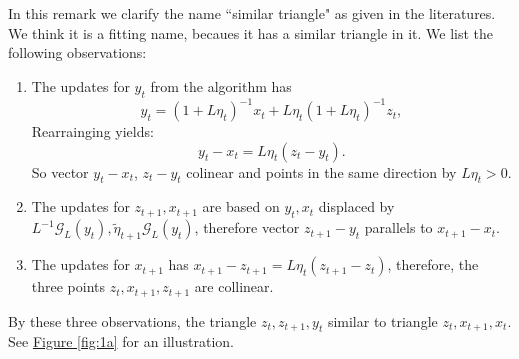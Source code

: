 \documentclass[12pt]{article}
\begin{document}
        \begin{remark}
            In this remark we clarify the name ``similar triangle" as given in the literatures. 
            We think it is a fitting name, becaues it has a similar triangle in it. 
            We list the following observations:
            \begin{enumerate}
                \item 
                The updates for $y_{t}$ from the algorithm has 
                $$
                    y_t = (1 + L\eta_t)^{-1} x_t + L\eta_t(1 + L\eta_t)^{-1} z_t, 
                $$
                Rearrainging yields: 
                $$
                    y_t - x_t = L\eta_t (z_t - y_t). 
                $$
                So vector $y_t - x_t$, $z_t - y_t$ colinear and points in the same direction by $L\eta_t > 0$. 
                \item 
                The updates for $z_{t + 1}, x_{t + 1}$ are based on $y_t, x_t$ displaced by $L^{-1} \mathcal G_L(y_t), \tilde\eta_{t +1} \mathcal G_L(y_t)$, therefore vector $z_{t + 1} - y_t$ parallels to $x_{t + 1} - x_t$. 
                \item 
                The updates for $x_{t + 1}$ has $x_{t + 1} - z_{t + 1} = L\eta_t \left(z_{t + 1} - z_t\right)$, therefore, the three points $z_t, x_{t + 1}, z_{t + 1}$ are collinear. 
            \end{enumerate}
            By these three observations, the triangle $z_{t}, z_{t + 1}, y_t$ similar to triangle $z_t, x_{t + 1}, x_t$. 
            See \hyperref[fig:1a]{Figure \ref*{fig:1a}}
            for an illustration. 
            \begin{figure}[h]
                \centering
\end{figure}
\end{remark}
\end{document}

